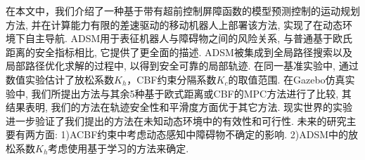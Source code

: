 \documentclass[preprint,5p,times,twocolumn]{elsarticle}
\begin{document}
在本文中，我们介绍了一种基于带有超前控制屏障函数的模型预测控制的运动规划方法, 并在计算能力有限的差速驱动的移动机器人上部署该方法, 实现了在动态环境下自主导航.
ADSM用于表征机器人与障碍物之间的风险关系, 与普通基于欧氏距离的安全指标相比, 它提供了更全面的描述.
ADSM被集成到全局路径搜索以及局部路径优化求解的过程中, 以得到安全可靠的局部轨迹. 
在同一基准实验中, 通过数值实验估计了放松系数$K_h$，CBF约束分隔系数$K_c$的取值范围. 
在Gazebo仿真实验中, 我们所提出方法与其余5种基于欧式距离或CBF的MPC方法进行了比较, 其结果表明, 我们的方法在轨迹安全性和平滑度方面优于其它方法.
现实世界的实验进一步验证了我们提出的方法在未知动态环境中的有效性和可行性. 
未来的研究主要有两方面: 1)ACBF约束中考虑动态感知中障碍物不确定的影响. 2)ADSM中的放松系数$K_h$考虑使用基于学习的方法来确定.




\end{document}

